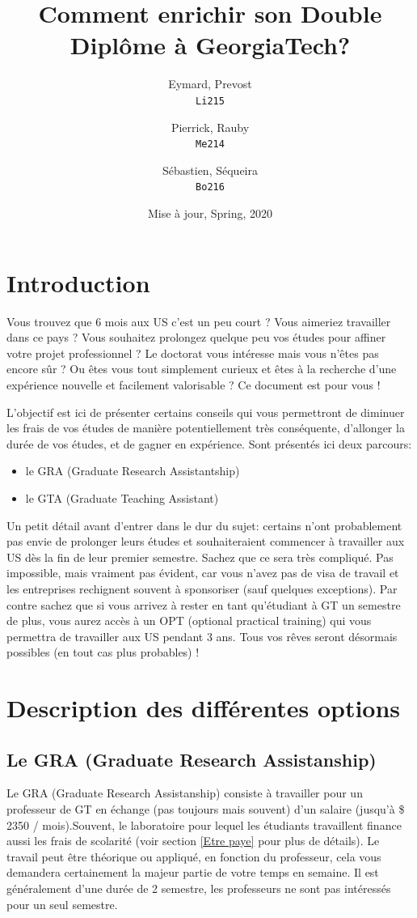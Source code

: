 \documentclass{article}
\title{Comment enrichir son Double Diplôme à GeorgiaTech?}
\date{Mise à jour, Spring, 2020}
\author{
  Eymard, Prevost\\
  \texttt{Li215}
  \and
  Pierrick, Rauby\\
  \texttt{Me214}
  \and 
  Sébastien, Séqueira\\
  \texttt{Bo216}
}
\begin{document}
{}
\maketitle 

\section{Introduction}
Vous trouvez que 6 mois aux US c'est un peu court ? Vous aimeriez travailler dans ce pays ? Vous souhaitez prolongez quelque peu vos études pour affiner votre projet professionnel ? Le doctorat vous intéresse mais vous n'êtes pas encore sûr ? Ou êtes vous tout simplement curieux et êtes à la recherche d'une expérience nouvelle et facilement valorisable ? Ce document est pour vous !

L'objectif est ici de présenter certains conseils qui vous permettront de diminuer les frais de vos études de manière potentiellement très conséquente, d'allonger la durée de vos études, et de gagner en expérience. 
Sont présentés ici deux parcours:
\begin{itemize}
\item le GRA (Graduate Research Assistantship)
\item le GTA (Graduate Teaching Assistant)
\end{itemize}
Un petit détail avant d'entrer dans le dur du sujet: certains n'ont probablement pas envie de prolonger leurs études et souhaiteraient commencer à travailler aux US dès la fin de leur premier semestre. Sachez que ce sera très compliqué. Pas impossible, mais vraiment pas évident, car vous n'avez pas de visa de travail et les entreprises rechignent souvent à sponsoriser (sauf quelques exceptions). Par contre sachez que si vous arrivez à rester en tant qu'étudiant à GT un semestre de plus, vous aurez accès à un OPT (optional practical training) qui vous permettra de travailler aux US pendant 3 ans. Tous vos rêves seront désormais possibles (en tout cas plus probables) !

\section{Description des différentes options}
\subsection{Le GRA (Graduate Research Assistanship)}


 Le GRA (Graduate Research Assistanship) consiste à travailler pour un professeur de GT en échange (pas toujours mais souvent) d'un salaire (jusqu'à 
\$ 2350 / mois).Souvent, le laboratoire  pour lequel les étudiants travaillent finance aussi les frais de scolarité  (voir section \ref{Etre paye} pour plus de détails). Le travail peut être théorique ou appliqué, en fonction du professeur, cela vous demandera certainement la majeur partie de votre temps en semaine. Il est généralement d'une durée de 2 semestre, les professeurs ne sont pas intéressés pour un seul semestre.
\end{document}
